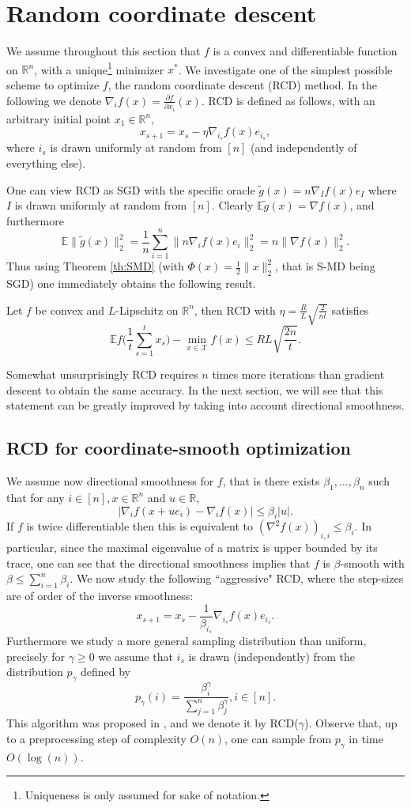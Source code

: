 \documentclass[openany]{now}
\newcommand{\tg}{\tilde{g}}
\newcommand{\E}{\mathbb{E}}
\newcommand{\R}{\mathbb{R}}
\renewcommand{\tilde}{\widetilde}
\begin{document}
\section{Random coordinate descent}
We assume throughout this section that $f$ is a convex and differentiable function on $\R^n$, with a unique\footnote{Uniqueness is only assumed for sake of notation.} minimizer $x^*$. We investigate one of the simplest possible scheme to optimize $f$, the random coordinate descent (RCD) method. In the following we denote $\nabla_i f(x) = \frac{\partial f}{\partial x_i} (x)$. RCD is defined as follows, with an arbitrary initial point $x_1 \in \R^n$,
$$x_{s+1} = x_s - \eta \nabla_{i_s} f(x) e_{i_s} ,$$
where $i_s$ is drawn uniformly at random from $[n]$ (and independently of everything else). 

One can view RCD as SGD with the specific oracle $\tg(x) = n \nabla_{I} f(x) e_I$ where $I$ is drawn uniformly at random from $[n]$. Clearly $\E \tg(x) = \nabla f(x)$, and furthermore
$$\E \|\tg(x)\|_2^2 = \frac{1}{n}\sum_{i=1}^n \|n \nabla_{i} f(x) e_i\|_2^2 = n \|\nabla f(x)\|_2^2 .$$
Thus using Theorem \ref{th:SMD} (with $\Phi(x) = \frac12 \|x\|_2^2$, that is S-MD being SGD) one immediately obtains the following result. 
\begin{theorem}
Let $f$ be convex and $L$-Lipschitz on $\R^n$, then RCD with $\eta = \frac{R}{L} \sqrt{\frac{2}{n t}}$ satisfies
$$\E f\bigg(\frac{1}{t} \sum_{s=1}^t x_s \bigg) - \min_{x \in \mathcal{X}} f(x) \leq R L \sqrt{\frac{2 n}{t}} .$$
\end{theorem}
Somewhat unsurprisingly RCD requires $n$ times more iterations than gradient descent to obtain the same accuracy. In the next section, we will see that this statement can be greatly improved by taking into account directional smoothness.

\subsection{RCD for coordinate-smooth optimization}
We assume now directional smoothness for $f$, that is there exists $\beta_1, \hdots, \beta_n$ such that for any $i \in [n], x \in \R^n$ and $u \in \R$,
$$| \nabla_i f(x+u e_i) - \nabla_i f(x) | \leq \beta_i |u| .$$
If $f$ is twice differentiable then this is equivalent to $(\nabla^2 f(x))_{i,i} \leq \beta_i$. In particular, since the maximal eigenvalue of a matrix is upper bounded by its trace, one can see that the directional smoothness implies that $f$ is $\beta$-smooth with $\beta \leq \sum_{i=1}^n \beta_i$. We now study the following ``aggressive" RCD, where the step-sizes are of order of the inverse smoothness:
$$x_{s+1} = x_s - \frac{1}{\beta_{i_s}} \nabla_{i_s} f(x) e_{i_s} .$$
Furthermore we study a more general sampling distribution than uniform, precisely for $\gamma \geq 0$ we assume that $i_s$ is drawn (independently) from the distribution $p_{\gamma}$ defined by
$$p_{\gamma}(i) = \frac{\beta_i^{\gamma}}{\sum_{j=1}^n \beta_j^{\gamma}}, i \in [n] .$$
This algorithm was proposed in \cite{Nes12}, and we denote it by RCD($\gamma$). Observe that, up to a preprocessing step of complexity $O(n)$, one can sample from $p_{\gamma}$ in time $O(\log(n))$. 
\end{document}
